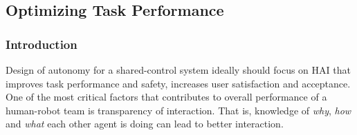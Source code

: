 \documentclass[12pt]{article}
\begin{document}
%
%	
%	
%	
%

%
%

 
\subsection{Optimizing Task Performance}

\subsubsection{Introduction}
Design of autonomy for a shared-control system ideally should focus on HAI that improves task performance and safety, increases user satisfaction and acceptance. One of the most critical factors that contributes to overall performance of a human-robot team is transparency of interaction. That is, knowledge of \textit{why}, \textit{how} and \textit{what} each other agent is doing can lead to better interaction. 
\end{document}
